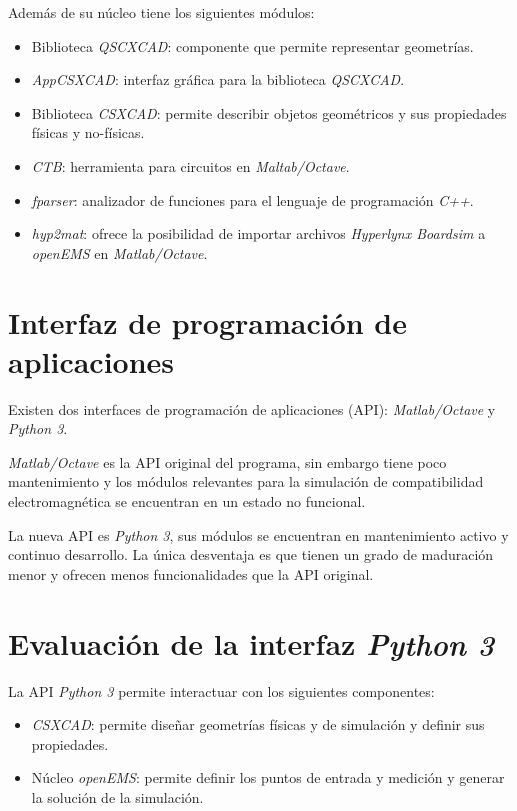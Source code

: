 \documentclass[
    11pt,
    spanish,
    a4paper
]{article}
\begin{document}
Además de su núcleo tiene los siguientes módulos:

\begin{itemize}
\item Biblioteca \emph{QSCXCAD}: componente que permite representar geometrías.
\item \emph{AppCSXCAD}: interfaz gráfica para la biblioteca \emph{QSCXCAD}.
\item Biblioteca \emph{CSXCAD}: permite describir objetos geométricos y sus propiedades físicas y no-físicas.
\item \emph{CTB}: herramienta para circuitos en \emph{Maltab/Octave}.
\item \emph{fparser}: analizador de funciones para el lenguaje de programación \emph{C++}.
\item \emph{hyp2mat}: ofrece la posibilidad de importar archivos \emph{Hyperlynx Boardsim} a \emph{openEMS} en \emph{Matlab/Octave}.
\end{itemize}

\section*{Interfaz de programación de aplicaciones}

Existen dos interfaces de programación de aplicaciones (API): \emph{Matlab/Octave} y \emph{Python 3}.

\emph{Matlab/Octave} es la API original del programa, sin embargo tiene poco mantenimiento y los módulos relevantes para la simulación de compatibilidad electromagnética se encuentran en un estado no funcional.

La nueva API es \emph{Python 3}, sus módulos se encuentran en mantenimiento activo y continuo desarrollo.
La única desventaja es que tienen un grado de maduración menor y ofrecen menos funcionalidades que la API original.

\section*{Evaluación de la interfaz \emph{Python 3}}

La API \emph{Python 3} permite interactuar con los siguientes componentes:

\begin{itemize}
\item \emph{CSXCAD}: permite diseñar geometrías físicas y de simulación y definir sus propiedades.
\item Núcleo \emph{openEMS}: permite definir los puntos de entrada y medición y generar la solución de la simulación.
\end{itemize}
\end{document}
